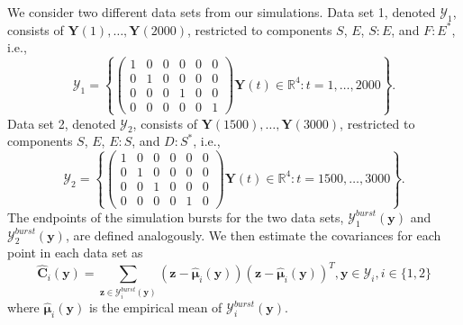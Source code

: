 \documentclass[aip,jcp,preprint]{revtex4-1}
\begin{document}
We consider two different data sets from our simulations.
%
Data set 1, denoted $\mathcal{Y}_1$, consists of $\mathbf{Y}(1), \dots, \mathbf{Y}(2000)$, restricted to components $S$, $E$, $S:E$, and $F:E^{*}$, i.e.,
$$\mathcal{Y}_1 = \left\{
\left( \begin{array}{cccccc}
1 & 0 & 0 & 0 & 0 & 0 \\
0 & 1 & 0 & 0 & 0 & 0 \\
0 & 0 & 0 & 1 & 0 & 0 \\
0 & 0 & 0 & 0 & 0 & 1
\end{array} \right) \mathbf{Y}(t) \in \mathbb{R}^4: t=1, \dots, 2000 \right\}.$$
%
Data set 2, denoted $\mathcal{Y}_2$, consists of $\mathbf{Y}(1500), \dots, \mathbf{Y}(3000)$, restricted to components $S$, $E$, $E:S$, and $D:S^{*}$, i.e.,
$$\mathcal{Y}_2 = \left\{
\left( \begin{array}{cccccc}
1 & 0 & 0 & 0 & 0 & 0 \\
0 & 1 & 0 & 0 & 0 & 0 \\
0 & 0 & 1 & 0 & 0 & 0 \\
0 & 0 & 0 & 0 & 1 & 0
\end{array} \right)
\mathbf{Y}(t) \in \mathbb{R}^4: t=1500, \dots, 3000 \right\}.$$
%
The endpoints of the simulation bursts for the two data sets, $\mathcal{Y}^{burst}_1(\mathbf{y})$ and $\mathcal{Y}^{burst}_2(\mathbf{y})$, are defined analogously.
%
We then estimate the covariances for each point in each data set as
\begin{equation}
\widehat{\mathbf{C}}_i(\mathbf{y}) = \sum_{\mathbf{z} \in \mathcal{Y}^{burst}_i(\mathbf{y})} \left( \mathbf{z} - \hat{\mathbf{\mu}}_i(\mathbf{y}) \right)\left( \mathbf{z} - \hat{\mathbf{\mu}}_i(\mathbf{y}) \right)^T, \mathbf{y} \in \mathcal{Y}_i, i \in \{1, 2\}
\end{equation}
where $\hat{\mathbf{\mu}}_i(\mathbf{y})$ is the empirical mean of $\mathcal{Y}^{burst}_i(\mathbf{y})$.
\end{document}
